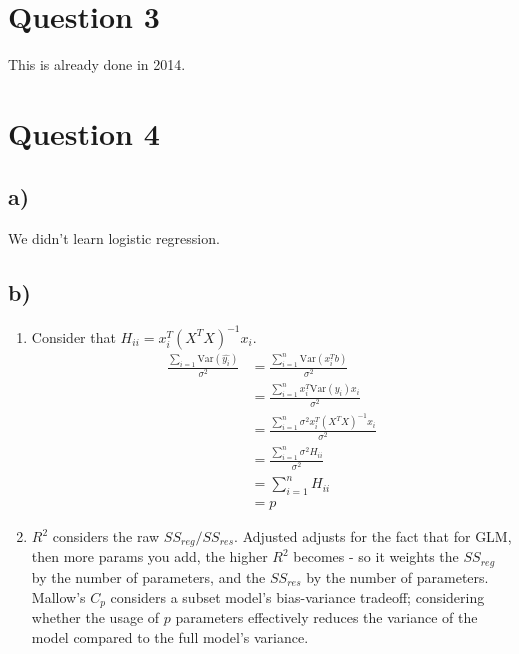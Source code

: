 \documentclass{article}
\begin{document}
\section*{Question 3}
This is already done in 2014.

\section*{Question 4}
\subsection*{a)}
We didn't learn logistic regression.

\subsection*{b)}
\begin{enumerate}
    \item Consider that $H_{ii} = x_i^T(X^TX)^{-1}x_i$.
    \begin{align*}
        \frac{\sum_{i=1}\text{Var}(\hat{y_i})}{\sigma^2} &= \frac{\sum_{i=1}^n\text{Var}(x_i^Tb)}{\sigma^2} \\
        &= \frac{\sum_{i=1}^n x_i^T\text{Var}(y_i)x_i}{\sigma^2} \\ 
        &= \frac{\sum_{i=1}^n \sigma^2x_i^T(X^TX)^{-1}x_i}{\sigma^2} \\ 
        &= \frac{\sum_{i=1}^n \sigma^2H_{ii}}{\sigma^2} \\ 
        &= \sum_{i=1}^n H_{ii} \\ 
        &= p
    \end{align*}
    \item $R^2$ considers the raw $SS_{reg}/SS_{res}$. Adjusted adjusts for the fact that for GLM,
    then more params you add, the higher $R^2$ becomes - so it weights the $SS_{reg}$ by the number of 
    parameters, and the $SS_{res}$ by the number of parameters. Mallow's $C_p$ considers a subset model's 
    bias-variance tradeoff; considering whether the usage of $p$ parameters effectively reduces 
    the variance of the model compared to the full model's variance. 
\end{enumerate}
\end{document}
